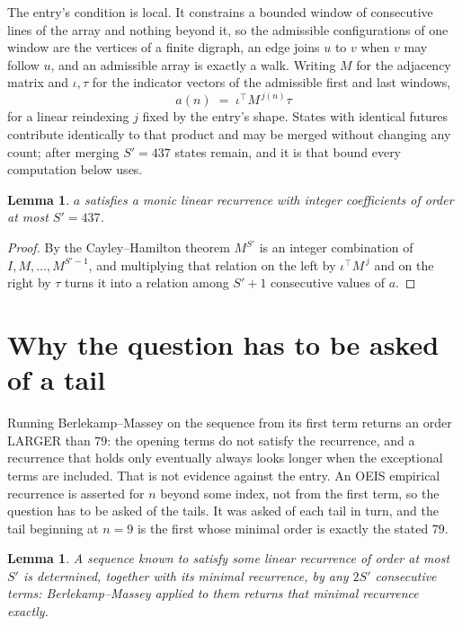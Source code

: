 \documentclass[11pt,a4paper]{article}
\theoremstyle{plain}
\newtheorem{lemma}[theorem]{Lemma}
\theoremstyle{definition}
\begin{document}
The entry's condition is local. It constrains a bounded window of consecutive lines of the
array and nothing beyond it, so the admissible configurations of one window are the vertices of
a finite digraph, an edge joins $u$ to $v$ when $v$ may follow $u$, and an admissible array is
exactly a walk. Writing $M$ for the adjacency matrix and $\iota,\tau$ for the indicator vectors
of the admissible first and last windows,
\[
a(n)\;=\;\iota^{\!\top}M^{\,j(n)}\tau
\]
for a linear reindexing $j$ fixed by the entry's shape. States with identical futures
contribute identically to that product and may be merged without changing any count; after
merging $S'=437$ states remain, and it is that bound every computation below uses.

\begin{lemma}\label{lem:cf}
$a$ satisfies a monic linear recurrence with integer coefficients of order at most $S'=437$.
\end{lemma}

\begin{proof}
By the Cayley--Hamilton theorem $M^{S'}$ is an integer combination of $I,M,\dots,M^{S'-1}$,
and multiplying that relation on the left by $\iota^{\!\top}M^{\,j}$ and on the right by
$\tau$ turns it into a relation among $S'+1$ consecutive values of $a$.
\end{proof}

\section{Why the question has to be asked of a tail}

Running Berlekamp--Massey on the sequence from its first term returns an order LARGER than $79$: the opening terms do not satisfy the recurrence, and a recurrence that holds only eventually always looks longer when the exceptional terms are included. That is not evidence against the entry. An OEIS empirical recurrence is asserted for $n$ beyond some index, not from the first term, so the question has to be asked of the tails. It was asked of each tail in turn, and the tail beginning at $n=9$ is the first whose minimal order is exactly the stated $79$.

\begin{lemma}\label{lem:bm}
A sequence known to satisfy some linear recurrence of order at most $S'$ is determined,
together with its minimal recurrence, by any $2S'$ consecutive terms: Berlekamp--Massey applied
to them returns that minimal recurrence exactly.
\end{lemma}
\end{document}
